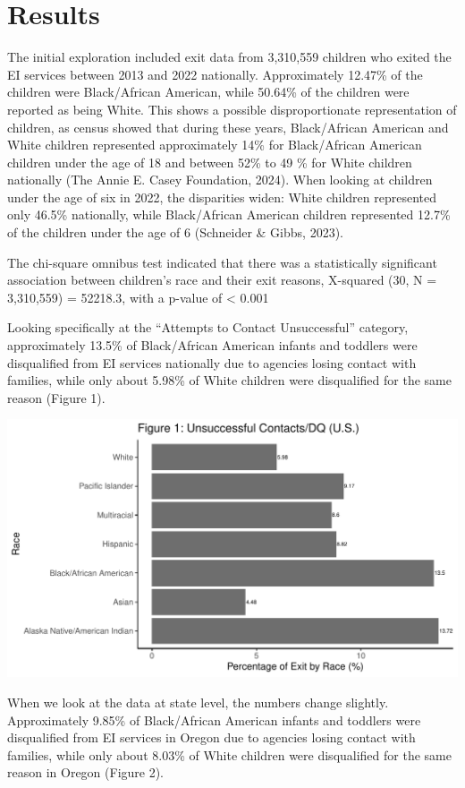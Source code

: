 \documentclass[
  letterpaper,
  DIV=11,
  numbers=noendperiod]{scrartcl}
\begin{document}
\section{Results}\label{results}

The initial exploration included exit data from 3,310,559 children who
exited the EI services between 2013 and 2022 nationally. Approximately
12.47\% of the children were Black/African American, while 50.64\% of
the children were reported as being White. This shows a possible
disproportionate representation of children, as census showed that
during these years, Black/African American and White children
represented approximately 14\% for Black/African American children under
the age of 18 and between 52\% to 49 \% for White children nationally
(The Annie E. Casey Foundation, 2024). When looking at children under
the age of six in 2022, the disparities widen: White children
represented only 46.5\% nationally, while Black/African American
children represented 12.7\% of the children under the age of 6
(Schneider \& Gibbs, 2023).

The chi-square omnibus test indicated that there was a statistically
significant association between children's race and their exit reasons,
X-squared (30, N = 3,310,559) = 52218.3, with a p-value of \textless{}
0.001

Looking specifically at the ``Attempts to Contact Unsuccessful''
category, approximately 13.5\% of Black/African American infants and
toddlers were disqualified from EI services nationally due to agencies
losing contact with families, while only about 5.98\% of White children
were disqualified for the same reason (Figure 1).

\includegraphics{v1_files/figure-pdf/unnamed-chunk-15-1.pdf}

When we look at the data at state level, the numbers change slightly.
Approximately 9.85\% of Black/African American infants and toddlers were
disqualified from EI services in Oregon due to agencies losing contact
with families, while only about 8.03\% of White children were
disqualified for the same reason in Oregon (Figure 2).
\end{document}
